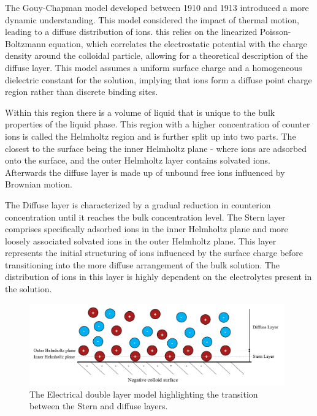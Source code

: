 The Gouy-Chapman model developed between 1910 and 1913 introduced a more dynamic understanding. This model considered the impact of thermal motion, leading to a diffuse distribution of ions. this relies on the linearized Poisson-Boltzmann equation, which correlates the electrostatic potential with the charge density around the colloidal particle, allowing for a theoretical description of the diffuse layer. This model assumes a uniform surface charge and a homogeneous dielectric constant for the solution, implying that ions form a diffuse point charge region rather than discrete binding sites.


Within this region there is a volume of liquid that is unique to the bulk properties of the liquid phase. This region with a higher concentration of counter ions is called the Helmholtz region and is further split up into two parts. The closest to the surface being the inner Helmholtz plane - where ions are adsorbed onto the surface, and the outer Helmholtz layer contains solvated ions. Afterwards the diffuse layer is made up of unbound free ions influenced by Brownian motion.

The Diffuse layer is characterized by a gradual reduction in counterion concentration until it reaches the bulk concentration level. The Stern layer comprises specifically adsorbed ions in the inner Helmholtz plane and more loosely associated solvated ions in the outer Helmholtz plane. This layer represents the initial structuring of ions influenced by the surface charge before transitioning into the more diffuse arrangement of the bulk solution. The distribution of ions in this layer is highly dependent on the electrolytes present in the solution.

\begin{figure}[h]     %
        \begin{center}
          \includegraphics[width=110mm]{chapter1/SternLayer.PNG}
\end{center}
\caption{The Electrical double layer model highlighting the transition between the Stern and diffuse layers.}
\label{fig:Stern}                 %
\end{figure}


